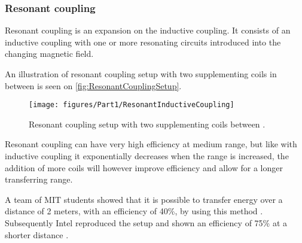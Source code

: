 \subsubsection{Resonant coupling}\label{sec:ResonantCoupling}
Resonant coupling is an expansion on the inductive coupling. It consists of an inductive coupling with one or more resonating circuits introduced into the changing magnetic field.

An illustration of resonant coupling setup with two supplementing coils in between is seen on \autoref{fig:ResonantCouplingSetup}. 
\begin{figure} [h]
	\centering
	\texttt{[image: figures/Part1/ResonantInductiveCoupling]}
	\caption{Resonant coupling setup with two supplementing coils between \citep{website:resonant_inductive_coupling}.}
	\label{fig:ResonantCouplingSetup}
\end{figure}

Resonant coupling can have very high efficiency at medium range, but like with inductive coupling it exponentially decreases when the range is increased, the addition of more coils will however improve efficiency and allow for a longer transferring range.

A team of MIT students showed that it is possible to transfer energy over a distance of 2 meters, with an efficiency of 40\%, by using this method \citep{website:WiTricity_Highly_Resonant_Wireless_Power}. Subsequently Intel reproduced the setup and shown an efficiency of 75\% at a shorter distance \citep{TechReport:WPTSheik}.
